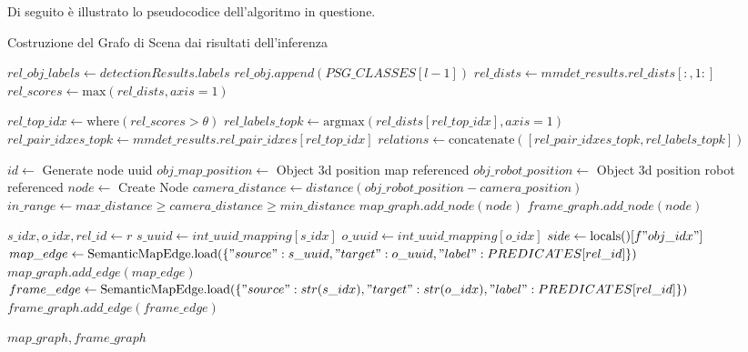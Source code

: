 Di seguito è illustrato lo pseudocodice dell'algoritmo in questione.
\begin{algorithm}[H]
  \caption{Costruzione del Grafo di Scena dai risultati dell'inferenza}
  \begin{algorithmic}[1]
  \State $rel\_obj\_labels \gets detectionResults.labels$
    \State $rel\_obj.append(PSG\_CLASSES[l - 1])$
  \EndFor
  \State $rel\_dists \gets mmdet\_results.rel\_dists[:, 1:]$
  \State $rel\_scores \gets \text{max}(rel\_dists, axis=1)$
  
  \State $rel\_top\_idx \gets \text{where}(rel\_scores > \theta)$
  \State $rel\_labels\_topk \gets \text{argmax}(rel\_dists[rel\_top\_idx], axis=1)$
  \State $rel\_pair\_idxes\_topk \gets mmdet\_results.rel\_pair\_idxes[rel\_top\_idx]$
  \State $relations \gets \text{concatenate}([rel\_pair\_idxes\_topk, rel\_labels\_topk])$
  
      \State $id \gets$ Generate node uuid 
      \State $obj\_map\_position \gets$ Object 3d position map referenced
      \State $obj\_robot\_position \gets$ Object 3d position robot referenced
      \State $node \gets$ Create Node
      \State $camera\_distance \gets distance(obj\_robot\_position - camera\_position)$
      \State $in\_range \gets max\_distance \geq camera\_distance \geq min\_distance$
          \State $map\_graph.add\_node(node)$
            \State $frame\_graph.add\_node(node)$
          \EndIf
      \EndIf
  \EndFor
  
      \State $s\_idx, o\_idx, rel\_id \gets r$
      \State $s\_uuid \gets int\_uuid\_mapping[s\_idx]$
      \State $o\_uuid \gets int\_uuid\_mapping[o\_idx]$
              \State $side \gets \text{locals()}[f"{obj}\_idx"]$
              \State $map\_edge \gets \text{SemanticMapEdge.load}(\{ "source": s\_uuid, "target": o\_uuid, "label": PREDICATES[rel\_id] \})$
              \State $map\_graph.add\_edge(map\_edge)$
                  \State $frame\_edge \gets \text{SemanticMapEdge.load}(\{ "source": str(s\_idx), "target": str(o\_idx), "label": PREDICATES[rel\_id] \})$
                  \State $frame\_graph.add\_edge(frame\_edge)$
              \EndIf
          \EndFor
      \EndIf
  \EndFor
  
  \Return $map\_graph, frame\_graph$
  \EndProcedure
  \end{algorithmic}
  \end{algorithm}

